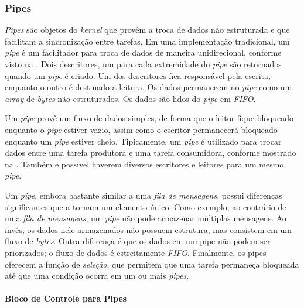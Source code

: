 
\subsubsection{Pipes}

\emph{Pipes} são objetos do \emph{kernel} que provêm a troca de dados não estruturada e que facilitam a sincronização entre tarefas. Em uma implementação tradicional, um \emph{pipe} é um facilitador para troca de dados de maneira unidirecional, conforme visto na . Dois descritores, um para cada extremidade do \emph{pipe} são retornados quando um \emph{pipe} é criado. Um dos descritores fica responsável pela escrita, enquanto o outro é destinado a leitura. Os dados permanecem no \emph{pipe} como um \emph{array} de \emph{bytes} não estruturados. Os dados são lidos do \emph{pipe} em \emph{FIFO}.


Um \emph{pipe} provê um fluxo de dados simples, de forma que o leitor fique bloqueado enquanto o \emph{pipe} estiver vazio, assim como o escritor permanecerá bloqueado enquanto um \emph{pipe} estiver cheio. Tipicamente, um \emph{pipe} é utilizado para trocar dados entre uma tarefa produtora e uma tarefa consumidora, conforme mostrado na . Também é possível haverem diversos escritores e leitores para um mesmo \emph{pipe}.


Um \emph{pipe}, embora bastante similar a uma \emph{fila de mensagens}, possui diferenças significantes que a tornam um elemento único. Como exemplo, ao contrário de uma \emph{fila de mensagens}, um \emph{pipe} não pode armazenar multiplas mensagens. Ao invés, os dados nele armazenados não possuem estrutura, mas consistem em um fluxo de \emph{bytes}. Outra diferença é que os dados em um pipe não podem ser priorizados; o fluxo de dados é estreitamente \emph{FIFO}. Finalmente, os pipes oferecem a função de \emph{seleção}, que permitem que uma tarefa permaneça bloqueada até que uma condição ocorra em um ou mais \emph{pipes}.

\paragraph{Bloco de Controle para Pipes}

